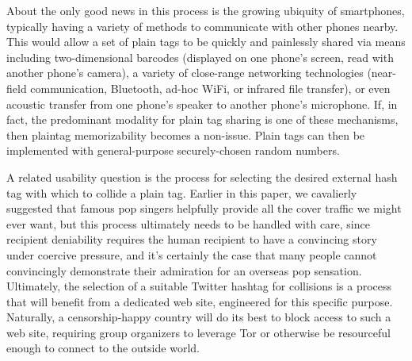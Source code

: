 About the only good news in this process is the growing ubiquity of smartphones, typically having a variety of methods to communicate with other phones nearby. This would allow a set of plain tags to be quickly and painlessly shared via means including two-dimensional barcodes (displayed on one phone's screen, read with another phone's camera), a variety of close-range networking technologies (near-field communication, Bluetooth, ad-hoc WiFi, or infrared file transfer), or even acoustic transfer from one phone's speaker to another phone's microphone. If, in fact, the predominant modality for \hoot plain tag sharing is one of these mechanisms, then plaintag memorizability becomes a non-issue. Plain tags can then be implemented with general-purpose securely-chosen random numbers.

A related usability question is the process for selecting the desired external hash tag with which to collide a \hoot plain tag. Earlier in this paper, we cavalierly suggested that famous pop singers helpfully provide all the cover traffic we might ever want, but this process ultimately needs to be handled with care, since recipient deniability requires the human recipient to have a convincing story under coercive pressure, and it's certainly the case that many people cannot convincingly demonstrate their admiration for an overseas pop sensation. Ultimately, the selection of a suitable Twitter hashtag for \hoot collisions is a process that will benefit from a dedicated web site, engineered for this specific purpose. Naturally, a censorship-happy country will do its best to block access to such a web site, requiring group organizers to leverage Tor or otherwise be resourceful enough to connect to the outside world.


